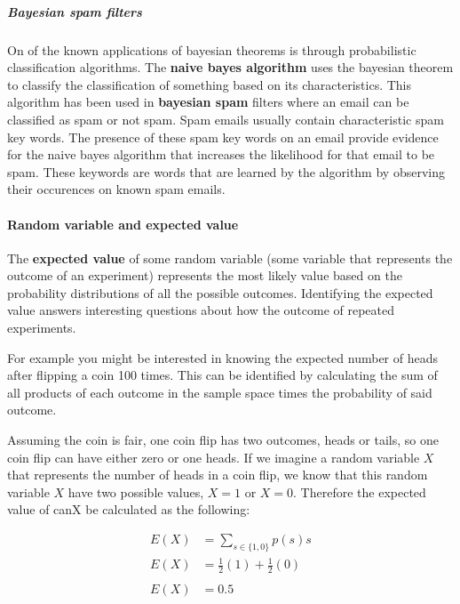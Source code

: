 \hypertarget{bayesian-spam-filters}{%
\subparagraph{Bayesian spam filters}\label{bayesian-spam-filters}}

On of the known applications of bayesian theorems is through
probabilistic classification algorithms. The \textbf{naive bayes
algorithm} uses the bayesian theorem to classify the classification of
something based on its characteristics. This algorithm has been used in
\textbf{bayesian spam} filters where an email can be classified as spam
or not spam. Spam emails usually contain characteristic spam key words.
The presence of these spam key words on an email provide evidence for
the naive bayes algorithm that increases the likelihood for that email
to be spam. These keywords are words that are learned by the algorithm
by observing their occurences on known spam emails.

\hypertarget{random-variable-and-expected-value}{%
\paragraph{Random variable and expected
value}\label{random-variable-and-expected-value}}

The \textbf{expected value} of some random variable (some variable that
represents the outcome of an experiment) represents the most likely
value based on the probability distributions of all the possible
outcomes. Identifying the expected value answers interesting questions
about how the outcome of repeated experiments.

For example you might be interested in knowing the expected number of
heads after flipping a coin 100 times. This can be identified by
calculating the sum of all products of each outcome in the sample space
times the probability of said outcome.

Assuming the coin is fair, one coin flip has two outcomes, heads or
tails, so one coin flip can have either zero or one heads. If we imagine
a random variable \textbf{\(X\)} that represents the number of heads in
a coin flip, we know that this random variable \textbf{\(X\)} have two
possible values, \textbf{\(X=1\)} or \textbf{\(X=0\)}. Therefore the
expected value of canX be calculated as the following:

\[
\begin{aligned}
E(X)&=\sum_{s\in\{1,0\}}{p(s)s}\\
E(X)&=\frac{1}{2}(1)+\frac{1}{2}(0)\\\\
E(X)&=0.5
\end{aligned}
\]

